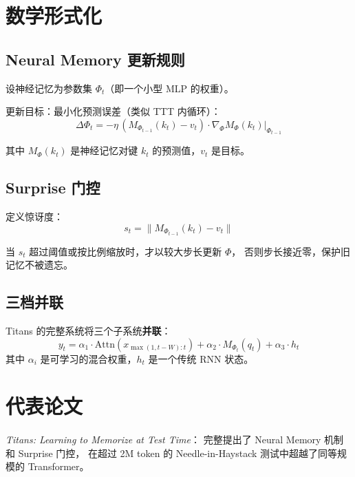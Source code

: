 \section{数学形式化}

\subsection*{Neural Memory 更新规则}

设神经记忆为参数集 $\Phi_t$（即一个小型 MLP 的权重）。

更新目标：最小化预测误差（类似 TTT 内循环）：
\begin{equation}
  \Delta\Phi_t = -\eta\, (M_{\Phi_{t-1}}(k_t) - v_t) \cdot \nabla_\Phi M_\Phi(k_t)\Big|_{\Phi_{t-1}}
  \label{eq:neural_memory_update}
\end{equation}

其中 $M_{\Phi}(k_t)$ 是神经记忆对键 $k_t$ 的预测值，$v_t$ 是目标。

\subsection*{Surprise 门控}

定义惊讶度：
\begin{equation}
  s_t = \| M_{\Phi_{t-1}}(k_t) - v_t \|
  \label{eq:surprise}
\end{equation}

当 $s_t$ 超过阈值或按比例缩放时，才以较大步长更新 $\Phi$，
否则步长接近零，保护旧记忆不被遗忘。

\subsection*{三档并联}

Titans 的完整系统将三个子系统\textbf{并联}：
\begin{equation}
  y_t = \alpha_1 \cdot \text{Attn}(x_{\max(1, t-W):t}) 
      + \alpha_2 \cdot M_{\Phi_t}(q_t)
      + \alpha_3 \cdot h_t
\end{equation}
其中 $\alpha_i$ 是可学习的混合权重，$h_t$ 是一个传统 RNN 状态。

\section{代表论文}

\paragraph{\citet{behrouz2025titans}} \textit{Titans: Learning to Memorize at Test Time}：
完整提出了 Neural Memory 机制和 Surprise 门控，
在超过 2M token 的 Needle-in-Haystack 测试中超越了同等规模的 Transformer。

